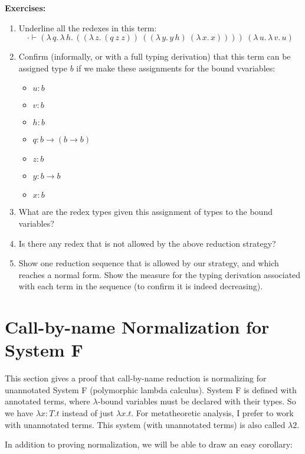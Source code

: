 \documentclass{article}
\begin{document}
\textbf{Exercises:}
\begin{enumerate}
\item Underline all the redexes in this term:
  \[
  \cdot\vdash (\lambda\,q.\,\lambda\,h.\,((\lambda\, z.\,(q\ z\ z))\ ((\lambda\, y.\,y\, h)\ (\lambda\,x.\,x))))\ (\lambda\,u.\,\lambda\,v.\,u)
  \]
\item Confirm (informally, or with a full typing derivation) that this term can be assigned type $b$ if we make these assignments for the bound vvariables:
  \begin{itemize}
  \item $u : b$
  \item $v : b$
  \item $h : b$
  \item $q : b \to (b \to b)$
  \item $z : b$
  \item $y : b \to b$
  \item $x : b$
  \end{itemize}

\item What are the redex types given this assignment of types to the bound variables?

\item Is there any redex that is not allowed by the above reduction strategy?

\item Show one reduction sequence that is allowed by our strategy, and which
  reaches a normal form.  Show the measure for the typing derivation associated
  with each term in the sequence (to confirm it is indeed decreasing).
\end{enumerate}

\section{Call-by-name Normalization for System F}

This section gives a proof that call-by-name reduction is normalizing
for unannotated System F (polymorphic lambda calculus).  System F is
defined with annotated terms, where $\lambda$-bound variables must be
declared with their types.  So we have $\lambda x:T.t$ instead of just
$\lambda x.t$.  For metatheoretic analysis, I prefer to work with
unannotated terms.  This system (with unannotated terms) is also
called $\lambda2$.

In addition to proving normalization, we will be able to draw an
easy corollary:
\end{document}
